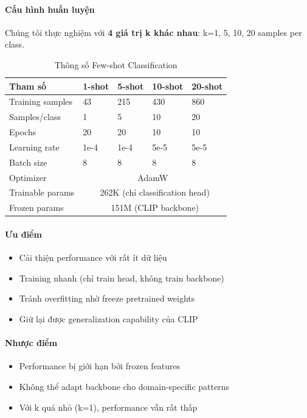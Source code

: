 \paragraph{Cấu hình huấn luyện}
Chúng tôi thực nghiệm với \textbf{4 giá trị k khác nhau}: k=1, 5, 10, 20 samples per class.

\begin{table}[H]
    \centering
    \caption{Thông số Few-shot Classification}
    \begin{tabular}{|l|l|l|l|l|}
        \hline
        \textbf{Tham số} & \textbf{1-shot} & \textbf{5-shot} & \textbf{10-shot} & \textbf{20-shot} \\
        \hline
        Training samples & 43 & 215 & 430 & 860 \\
        \hline
        Samples/class & 1 & 5 & 10 & 20 \\
        \hline
        Epochs & 20 & 20 & 10 & 10 \\
        \hline
        Learning rate & 1e-4 & 1e-4 & 5e-5 & 5e-5 \\
        \hline
        Batch size & 8 & 8 & 8 & 8 \\
        \hline
        Optimizer & \multicolumn{4}{c|}{AdamW} \\
        \hline
        Trainable params & \multicolumn{4}{c|}{~262K (chỉ classification head)} \\
        \hline
        Frozen params & \multicolumn{4}{c|}{~151M (CLIP backbone)} \\
        \hline
    \end{tabular}
    \label{tab:few-shot-config}
\end{table}

\paragraph{Ưu điểm}
\begin{itemize}
    \item Cải thiện performance với rất ít dữ liệu
    \item Training nhanh (chỉ train head, không train backbone)
    \item Tránh overfitting nhờ freeze pretrained weights
    \item Giữ lại được generalization capability của CLIP
\end{itemize}

\paragraph{Nhược điểm}
\begin{itemize}
    \item Performance bị giới hạn bởi frozen features
    \item Không thể adapt backbone cho domain-specific patterns
    \item Với k quá nhỏ (k=1), performance vẫn rất thấp
\end{itemize}

